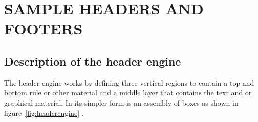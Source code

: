\clearpage
{}
\chapter{SAMPLE HEADERS AND FOOTERS}

%
%
%
%
%
%


\section{Description of the header engine}

The header engine works by defining three vertical regions to contain a top and bottom rule or other material and a middle layer that contains the text and or graphical material. In its simpler form is an assembly of boxes as shown in figure~\ref{fig:headerengine} .
\medskip

